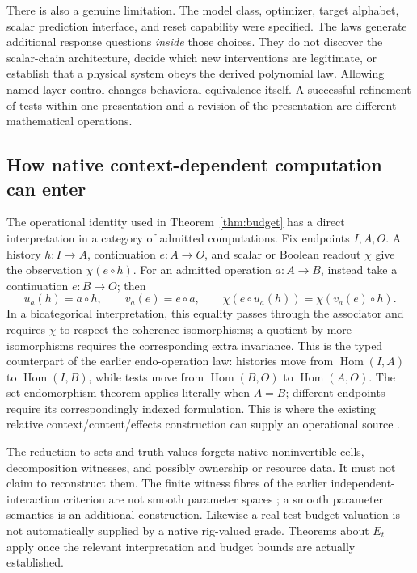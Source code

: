 \documentclass[11pt]{article}
\theoremstyle{definition}\newtheorem{definition}[theorem]{Definition}
\theoremstyle{remark}\newtheorem{remark}[theorem]{Remark}
\begin{document}
There is also a genuine limitation. The model class, optimizer, target
alphabet, scalar prediction interface, and reset capability were specified.
The laws generate additional response questions \emph{inside} those choices.
They do not discover the scalar-chain architecture, decide which new
interventions are legitimate, or establish that a physical system obeys
the derived polynomial law. Allowing named-layer control changes behavioral
equivalence itself. A successful refinement of tests within one presentation
and a revision of the presentation are different mathematical operations.

\subsection{How native context-dependent computation can enter}
The operational identity used in Theorem~\ref{thm:budget} has a direct
interpretation in a category of admitted computations. Fix endpoints $I,A,O$.
A history $h:I\to A$, continuation $e:A\to O$, and scalar or Boolean
readout $\chi$ give the observation $\chi(e\circ h)$. For an admitted
operation $a:A\to B$, instead take a continuation $e:B\to O$; then
\[
 u_a(h)=a\circ h,\qquad v_a(e)=e\circ a,
 \qquad\chi(e\circ u_a(h))=\chi(v_a(e)\circ h).
\]
In a bicategorical interpretation, this equality passes through the
associator and requires $\chi$ to respect the coherence isomorphisms; a
quotient by more isomorphisms requires the corresponding extra invariance.
This is the typed counterpart of the earlier endo-operation law: histories
move from $\operatorname{Hom}(I,A)$ to $\operatorname{Hom}(I,B)$, while
tests move from $\operatorname{Hom}(B,O)$ to $\operatorname{Hom}(A,O)$.
The set-endomorphism theorem applies literally when $A=B$; different
endpoints require its correspondingly indexed formulation.
This is where the existing relative context/content/effects construction
can supply an operational source \cite{relative-source}.

The reduction to sets and truth values forgets native noninvertible cells,
decomposition witnesses, and possibly ownership or resource data. It must
not claim to reconstruct them. The finite witness fibres of the earlier
independent-interaction criterion are not smooth parameter spaces
\cite{o1-source}; a smooth parameter semantics is an additional construction.
Likewise a real test-budget valuation is not automatically supplied by a
native rig-valued grade. Theorems about $E_t$ apply once the relevant
interpretation and budget bounds are actually established.
\end{document}
